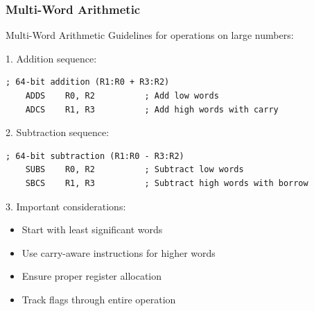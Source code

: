 \subsubsection{Multi-Word Arithmetic}

\begin{KR}{Multi-Word Arithmetic}
Guidelines for operations on large numbers:

1. Addition sequence:
\begin{lstlisting}[language=armasm, style=basesmol]
    ; 64-bit addition (R1:R0 + R3:R2)
    ADDS    R0, R2          ; Add low words
    ADCS    R1, R3          ; Add high words with carry
\end{lstlisting}

2. Subtraction sequence:
\begin{lstlisting}[language=armasm, style=basesmol]
    ; 64-bit subtraction (R1:R0 - R3:R2)
    SUBS    R0, R2          ; Subtract low words
    SBCS    R1, R3          ; Subtract high words with borrow
\end{lstlisting}

3. Important considerations:
\begin{itemize}
  \item Start with least significant words
  \item Use carry-aware instructions for higher words
  \item Ensure proper register allocation
  \item Track flags through entire operation
\end{itemize}
\end{KR}

